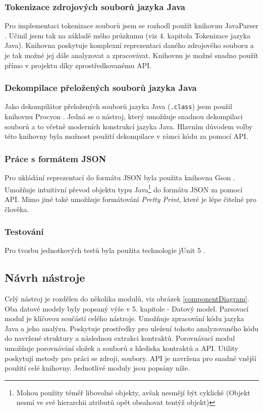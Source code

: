 			\subsubsection{Tokenizace zdrojových souborů jazyka Java}
				Pro implementaci tokenizace souborů jsem se rozhodl použít knihovnu JavaParser \cite{javaparser}. Učinil jsem tak na základě mého průzkumu (viz 4. kapitola Tokenizace jazyka Java). Knihovna poskytuje komplexní reprezentaci daného zdrojového souboru a je tak možné jej dále analyzovat a zpracovávat. Knihovnu je možné snadno použít přímo v projektu díky zprostředkovanému API.
			
			\subsubsection{Dekompilace přeložených souborů jazyka Java}
				Jako dekompilátor přeložených souborů jazyka Java (\texttt{.class}) jsem použil knihovnu Procyon \cite{procyon}. Jedná se o nástroj, který umožňuje snadnou dekompilaci souborů a to včetně moderních konstrukcí jazyka Java. Hlavním důvodem volby této knihovny byla možnost použití dekompilace v rámci kódu za pomocí API.
				
			\subsubsection{Práce s formátem JSON}
				Pro ukládání reprezentací do formátu JSON byla použita knihovna Gson \cite{gson}. Umožňuje intuitivní převod objektu typu Java\footnote{Mohou použity téměř libovolné objekty, avšak nesmějí být cyklické (Objekt nesmí ve své hierarchii atributů opět obsahovat tentýž objekt)} do formátu JSON za pomocí API. Mimo jiné také umožňuje formátování \emph{Pretty Print}, které je lépe čitelné pro člověka.
				
			\subsubsection{Testování}
				Pro tvorbu jednotkových testů byla použita technologie jUnit 5 \cite{junit}.   	 



		\subsection{Návrh nástroje}
			Celý nástroj je rozdělen do několika modulů, viz obrázek \ref{componentDiagram}. Oba datové modely byly popsaný výše v 5. kapitole - Datový model. Parsovací modul je klíčovou součástí celého nástroje. Umožňuje zpracování kódu jazyka Java a jeho analýzu. Poskytuje prostředky pro uležení tohoto analyzovaného kódu do navržené struktury a následnou extrakci kontraktů. Porovnávací modul umožňuje porovnávání složek a souborů z hlediska kontraktů a API. Utility poskytují metody pro práci se zdroji, soubory. API je navržena pro snadné vnější použití celé knihovny. Jednotlivé moduly jsou popsány níže.		
		
